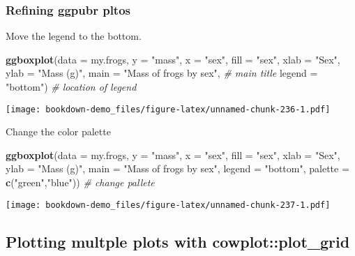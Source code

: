 \documentclass[]{book}
\newenvironment{Shaded}{\begin{snugshade}}{\end{snugshade}}
\newcommand{\KeywordTok}[1]{\textcolor[rgb]{0.13,0.29,0.53}{\textbf{#1}}}
\newcommand{\DataTypeTok}[1]{\textcolor[rgb]{0.13,0.29,0.53}{#1}}
\newcommand{\StringTok}[1]{\textcolor[rgb]{0.31,0.60,0.02}{#1}}
\newcommand{\CommentTok}[1]{\textcolor[rgb]{0.56,0.35,0.01}{\textit{#1}}}
\newcommand{\NormalTok}[1]{#1}
\theoremstyle{definition}
\theoremstyle{definition}
\theoremstyle{definition}
\theoremstyle{remark}
\begin{document}
\subsubsection{Refining ggpubr pltos}\label{refining-ggpubr-pltos}

Move the legend to the bottom.

\begin{Shaded}
\begin{Highlighting}[]
\KeywordTok{ggboxplot}\NormalTok{(}\DataTypeTok{data =}\NormalTok{ my.frogs,}
          \DataTypeTok{y =} \StringTok{"mass"}\NormalTok{,}
          \DataTypeTok{x =} \StringTok{"sex"}\NormalTok{,}
          \DataTypeTok{fill =} \StringTok{"sex"}\NormalTok{,}
          \DataTypeTok{xlab =} \StringTok{"Sex"}\NormalTok{,}
          \DataTypeTok{ylab =} \StringTok{"Mass (g)"}\NormalTok{,}
          \DataTypeTok{main =} \StringTok{"Mass of frogs by sex"}\NormalTok{, }\CommentTok{# main title}
          \DataTypeTok{legend =} \StringTok{"bottom"}\NormalTok{)             }\CommentTok{# location of legend}
\end{Highlighting}
\end{Shaded}

\texttt{[image: bookdown-demo\_files/figure-latex/unnamed-chunk-236-1.pdf]}

Change the color palette

\begin{Shaded}
\begin{Highlighting}[]
\KeywordTok{ggboxplot}\NormalTok{(}\DataTypeTok{data =}\NormalTok{ my.frogs,}
          \DataTypeTok{y =} \StringTok{"mass"}\NormalTok{,}
          \DataTypeTok{x =} \StringTok{"sex"}\NormalTok{,}
          \DataTypeTok{fill =} \StringTok{"sex"}\NormalTok{,}
          \DataTypeTok{xlab =} \StringTok{"Sex"}\NormalTok{,}
          \DataTypeTok{ylab =} \StringTok{"Mass (g)"}\NormalTok{,}
          \DataTypeTok{main =} \StringTok{"Mass of frogs by sex"}\NormalTok{,}
          \DataTypeTok{legend =} \StringTok{"bottom"}\NormalTok{,}
          \DataTypeTok{palette =} \KeywordTok{c}\NormalTok{(}\StringTok{"green"}\NormalTok{,}\StringTok{"blue"}\NormalTok{))  }\CommentTok{# change pallete}
\end{Highlighting}
\end{Shaded}

\texttt{[image: bookdown-demo\_files/figure-latex/unnamed-chunk-237-1.pdf]}

\subsection{Plotting multple plots with
cowplot::plot\_grid}\label{plotting-multple-plots-with-cowplotplot_grid}
\end{document}
